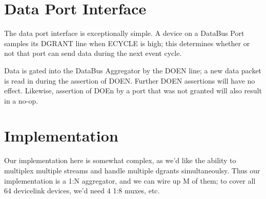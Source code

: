 \section{Data Port Interface}

The data port interface is exceptionally simple. A device on a DataBus
Port samples its DGRANT line when ECYCLE is high; this determines
whether or not that port can send data during the next event cycle.

Data is gated into the DataBus Aggregator by the DOEN line; a new data
packet is read in during the assertion of DOEN. Further DOEN
assertions will have no effect. Likewise, assertion of DOEn by a port
that was not granted will also result in a no-op. 

\section{Implementation}

Our implementation here is somewhat complex, as we'd like the ability
to multiplex multiple streams and handle multiple dgrants
simultaneoulsy. Thus our implementation is a 1:N aggregator, and we
can wire up M of them; to cover all 64 devicelink devices, we'd need 4
1:8 muxes, etc.

